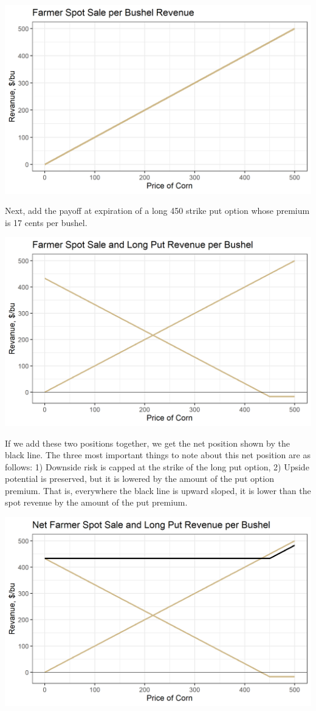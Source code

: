 \documentclass[
  letterpaper,
  DIV=11,
  numbers=noendperiod]{scrreprt}
\begin{document}
\includegraphics{assets/Options4-spot.png}

Next, add the payoff at expiration of a long 450 strike put option whose
premium is 17 cents per bushel.

\includegraphics{assets/Options4-spotput.png}

If we add these two positions together, we get the net position shown by
the black line. The three most important things to note about this net
position are as follows: 1) Downside risk is capped at the strike of the
long put option, 2) Upside potential is preserved, but it is lowered by
the amount of the put option premium. That is, everywhere the black line
is upward sloped, it is lower than the spot revenue by the amount of the
put premium.

\includegraphics{assets/Options4-spotputcomb.png}
\end{document}
